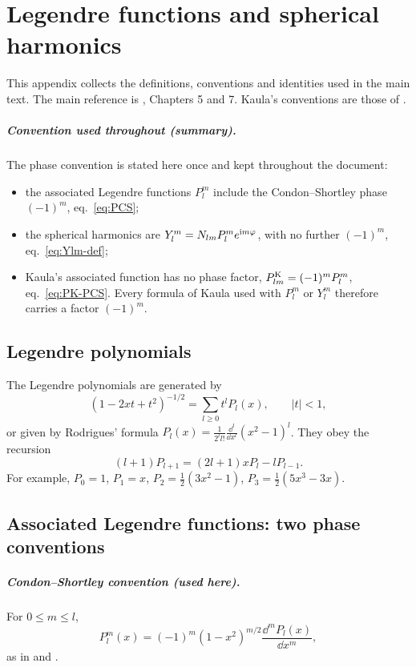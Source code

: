\chapter{Legendre functions and spherical harmonics}\label{app:harmonics}

This appendix collects the definitions, conventions and identities used in the main text. The main reference is \citet{Varshalovich1988}, Chapters 5 and 7. Kaula's conventions are those of \citet[\S1.2]{Kaula2000}.

\paragraph{Convention used throughout (summary).} The phase convention is stated here once and kept throughout the document:
\begin{itemize}
  \item the associated Legendre functions $P_l^m$ include the Condon--Shortley phase $(-1)^m$, eq.~\eqref{eq:PCS};
  \item the spherical harmonics are $Y_l^m=N_{lm}P_l^me^{\mathrm{i} m\varphi}$, with no further $(-1)^m$, eq.~\eqref{eq:Ylm-def};
  \item Kaula's associated function has no phase factor, $P^{\mathrm K}_{lm}=(-1)^mP_l^m$, eq.~\eqref{eq:PK-PCS}. Every formula of Kaula used with $P_l^m$ or $Y_l^m$ therefore carries a factor $(-1)^m$.
\end{itemize}

\section{Legendre polynomials}
The Legendre polynomials are generated by
\begin{equation}
  (1-2xt+t^2)^{-1/2}=\sum_{l\ge0}t^lP_l(x),\qquad |t|<1, \label{eq:legendre-gen}
\end{equation}
or given by Rodrigues' formula $P_l(x)=\frac{1}{2^ll!}\frac{\dd^l}{\dd x^l}(x^2-1)^l$. They obey the recursion
\[
  (l+1)P_{l+1}=(2l+1)xP_l-lP_{l-1}.
\]
For example, $P_0=1$, $P_1=x$, $P_2=\tfrac12(3x^2-1)$, $P_3=\tfrac12(5x^3-3x)$.

\section{Associated Legendre functions: two phase conventions}
\paragraph{Condon--Shortley convention (used here).} For $0\le m\le l$,
\begin{equation}
  P_l^m(x)=(-1)^m(1-x^2)^{m/2}\frac{\dd^mP_l(x)}{\dd x^m}, \label{eq:PCS}
\end{equation}
as in \citet[eq.~5.2(6)]{Varshalovich1988} and \citet{CondonShortley1935}.

